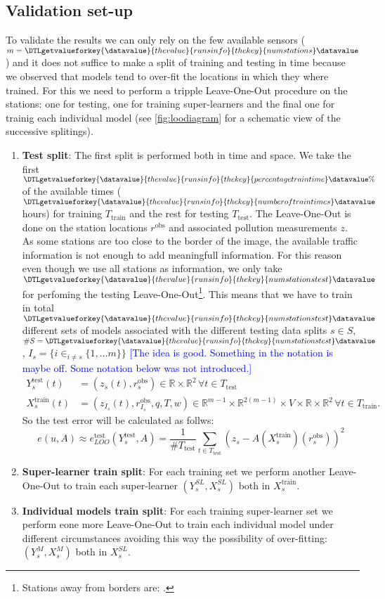 \documentclass[11pt,a4paper,twoside]{article}
\newcommand{\perplexityinsert}[1]{\DTLgetvalueforkey{\datavalue}{thevalue}{runsinfo}{thekey}{#1}\datavalue}
\theoremstyle{definition}
\numberwithin{equation}{section}
\newcommand{\bR}{\ensuremath{\mathbb{R}}}
\newcommand{\<}{\langle}
\renewcommand{\>}{\rangle}
\newcommand{\obs}{\ensuremath{\text{obs}}}
\newcommand{\test}{\text{test}}
\newcommand{\train}{\text{train}}
\newcommand{\om}[1]{\textcolor{blue}{#1}}
\begin{document}
\subsection{Validation set-up}
To validate the results we can only rely on the few available sensors ($m=\perplexityinsert{numstations}$) and it does not suffice to make a split of training and testing in time because we observed that models tend to over-fit the locations in which they where trained. For this we need to perform a tripple Leave-One-Out procedure on the stations: one for testing, one for training super-learners and the final one for trainig each individual model (see \cref{fig:loodiagram} for a schematic view of the successive splitings).
\begin{enumerate}
	\item \textbf{Test split}: The first split is performed both in time and space. We take the first $\perplexityinsert{percentagetraintime}\%$ of the available times ($\perplexityinsert{numberoftraintimes}$ hours) for training $T_{\train}$ and the rest for testing $T_{\test}$. The Leave-One-Out is done on the station locations $r^\obs$ and associated pollution measurements $z$. As some stations are too close to the border of the image, the available traffic information is not enough to add meaningfull information. For this reason even though we use all stations as information, we only take $\perplexityinsert{numstationstest}$ for perfoming the testing Leave-One-Out\footnote{Stations away from borders are: \perplexityinsert{stationstest}.}. This means that we have to train in total $\perplexityinsert{numstationstest}$ different sets of models associated with the different testing data splits $s\in S$, $\#S=\perplexityinsert{numstationstest}$, $I_s=\{i \in_{i \neq s} \{1, \dots m\}\}$ \om{[The idea is good. Something in the notation is maybe off. Some notation below was not introduced.]}
\begin{align}
	Y^{\test}_s(t) &= (z_s(t), r^\obs_s) \in \bR \times \bR^{2} \, \forall t \in T_{\test} \\
	X^{\train}_s(t) &= (z_{I_s}(t), r^\obs_{I_s}, q, T, w) \in \bR^{m-1} \times \bR^{2(m-1)} \times V \times \bR\times \bR^2 \, \forall t \in T_{\train}.	
\end{align}
	So the test error will be calculated as follws:
	$$e(u,A) \approx e^{\test}_{LOO}(Y^{\test}_s, A) = \frac{1}{\#T_{\test}}\sum_{t\in T_{\test}}\left(z_s-A(X^{\train}_s)(r^\obs_s)\right)^2$$
    \item \textbf{Super-learner train split}: For each training set we perform another Leave-One-Out to train each super-learner $(Y^{SL}_s, X^{SL}_s)$ both in $X^{\train}_s$.
    \item \textbf{Individual models train split}: For each training super-learner set we perform eone more Leave-One-Out to train each individual model under different circumstances avoiding this way the possibility of over-fitting: $(Y^{M}_s, X^{M}_s)$ both in $X^{SL}_s$.
\end{enumerate}
\end{document}
